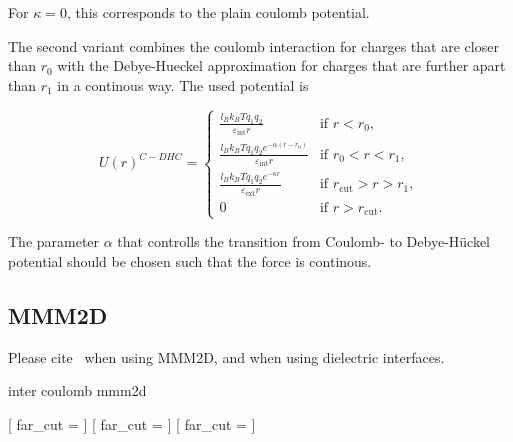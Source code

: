 For $\kappa = 0$, this corresponds to the plain coulomb potential.

The second variant combines the coulomb interaction for charges that are closer than $r_0$ with the Debye-Hueckel approximation for charges that are further apart than $r_1$ in a continous way. The used potential is 

\begin{equation}
  U(r)^{C-DHC} = 
  \begin{cases} 
    \frac{l_B k_B T q_1 q_2}{\varepsilon_{\text{int}} r} & \text{if } r < r_0, \\ 
    \frac{l_B k_B T q_1 q_2 e^{-\alpha (r - r_0)}}{\varepsilon_{\text{int}} r} & \text{if } r_0 < r < r_1,  \\
    \frac{l_B k_B T q_1 q_2 e^{-\kappa r}}{\varepsilon_{\text{ext}} r} & \text{if } r_{\text{cut}} > r > r_1,  \\
    0 & \text{if } r > r_{\text{cut}}.
  \end{cases}
\end{equation}

The parameter $\alpha$ that controlls the transition from Coulomb- to Debye-H\"uckel potential should be chosen such that the force is continous.

\subsection{MMM2D}

\begin{citebox}
  Please cite~ when using MMM2D, and
   when using dielectric interfaces.
\end{citebox}


\begin{essyntax}
 inter coulomb  mmm2d 
  \begin{features}
  \end{features}
\end{essyntax}
\begin{pysyntax}
	[
		far_cut = 
	]
	[
		far_cut = 
	]
	[
		far_cut = 
	]
\end{pysyntax}


